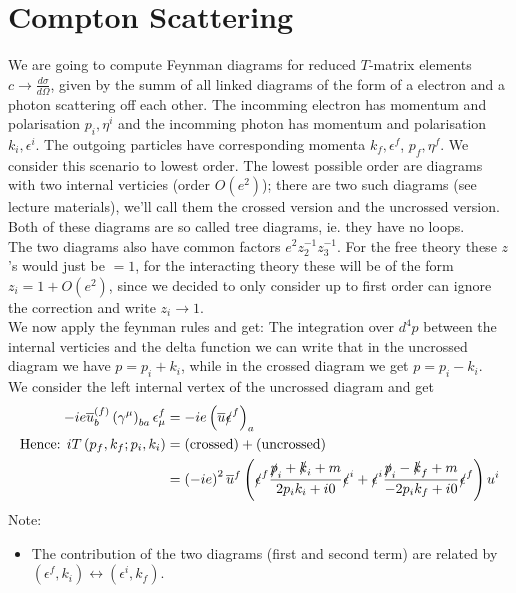 \documentclass{report}
\begin{document}
\section{Compton Scattering}
We are going to compute Feynman diagrams for reduced $T$-matrix elements $c \to \frac{d\sigma}{d \Omega} $, given by the summ of all linked diagrams of the form of a electron and a photon scattering off each other. The incomming electron has momentum and polarisation $p_i, \eta^{i} $ and the incomming photon has momentum and polarisation $k_i, \epsilon^{i} $. The outgoing particles have corresponding momenta $k_f, \epsilon^{f} $, $p_f, \eta^{f} $. We consider this scenario to lowest order. The lowest possible order are diagrams with two internal verticies (order $O\left( e^2 \right) $); there are two such diagrams (see lecture materials), we'll call them the crossed version and the uncrossed version. Both of these diagrams are so called tree diagrams, ie. they have no loops.\\
The two diagrams also have common factors $e^2 z_2^{-1} z_3^{-1} $. For the free theory these $z$ 's would just be $=1$, for the interacting theory these will be of the form $z_i = 1 + O\left( e^2 \right) $, since we decided to only consider up to first order can ignore the correction and write $z_i \to  1$.\\
We now apply the feynman rules and get: The integration over $d^{4} p$ between the internal verticies and the delta function we can write that in the uncrossed diagram we have $p = p_i + k_i$, while in the crossed diagram we get $p = p_i - k_i$.\\
We consider the left internal vertex of the uncrossed diagram and get
\begin{align*}
  -ie \overline{u}^{\left( f \right) }_b  \left( \gamma^{\mu} \right)_{ba} \epsilon^{f}_\mu &= 
  -ie \left( \overline{u} \slashed{\epsilon}^{f} \right)_a \\
  \text{Hence: } iT\left( p_f, k_f; p_i, k_i \right) &= \left( \text{crossed} \right) + \left( \text{uncrossed} \right)  \\
  &= \left( -ie \right) ^2 \overline{u}^{f} \left( \slashed{\epsilon}^{f} \frac{\slashed{p}_i + \slashed{k}_i + m}{2 p_i k_i + i 0}   \slashed{\epsilon}^{i}  +  \slashed{\epsilon}^{i} \frac{\slashed{p}_i - \slashed{k}_f + m}{-2 p_i k_f + i 0} \slashed{\epsilon}^{f}  \right) u^{i}  \\
\end{align*}
Note:\\
\begin{itemize}
  \item The contribution of the two diagrams (first and second term) are related by $\left( \epsilon^{f} , k_i \right) \leftrightarrow \left( \epsilon^{i} , k_f \right) $. 
\end{itemize}
\end{document}
